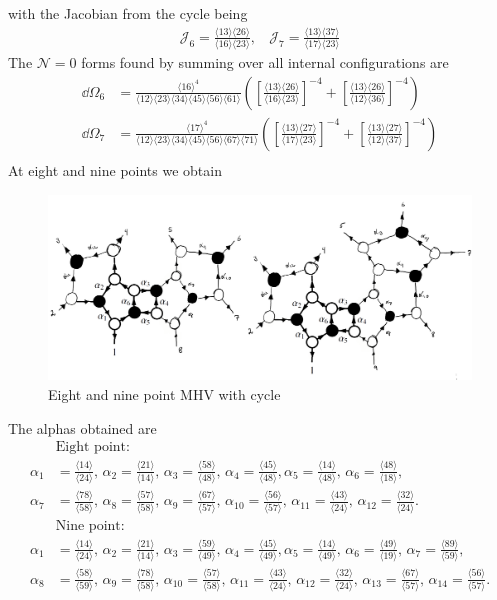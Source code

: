 \documentclass[letter,11pt]{article}
\newcommand{\J}{\mathcal{J}}
\newcommand{\ab}[1]{\langle #1 \rangle}
\begin{document}
with the Jacobian from the cycle being
\begin{equation}
	\begin{aligned}
		\J_6=\frac{\ab{13}\ab{26}}{\ab{16}\ab{23}},~~~~
		\J_7=\frac{\ab{13}\ab{37}}{\ab{17}\ab{23}}
	\end{aligned}
\end{equation}
The $\mathcal{N}=0$ forms found by summing over all internal configurations are
\begin{equation}
	\begin{aligned}
		\dd \Omega_6 &= \frac{\ab{16}^4}{\ab{12}\ab{23}\ab{34}\ab{45}\ab{56}\ab{61}}\left(\left[\frac{\ab{13}\ab{26}}{\ab{16}\ab{23}}
		\right]^{-4}+\left[\frac{\ab{13}\ab{26}}{\ab{12}\ab{36}}
		\right]^{-4}\right) \\
		\dd \Omega_7 &= \frac{\ab{17}^4}{\ab{12}\ab{23}\ab{34}\ab{45}\ab{56}\ab{67}\ab{71}}\left(\left[\frac{\ab{13}\ab{27}}{\ab{17}\ab{23}}
		\right]^{-4}+\left[\frac{\ab{13}\ab{27}}{\ab{12}\ab{37}}
		\right]^{-4}\right) \\
	\end{aligned}
\end{equation}
At eight and nine points we obtain
\begin{figure}[H]
	\centering
	\includegraphics[width=0.7\linewidth]{8+9pt}
	\caption{Eight and nine point MHV with cycle}
	\label{fig:two-loop}
\end{figure}
\noindent
The alphas obtained are
\begin{equation}
	\begin{aligned}
		&\text{Eight point}:\\
	\alpha_1&=\frac{\ab{14}}{\ab{24}},\,\alpha_2=\frac{\ab{21}}{\ab{14}},\,\alpha_3=\frac{\ab{58}}{\ab{48}},\,\alpha_4=\frac{\ab{45}}{\ab{48}},\alpha_5=\frac{\ab{14}}{\ab{48}},\,
	\alpha_6=\frac{\ab{48}}{\ab{18}},\\
	\alpha_7&=\frac{\ab{78}}{\ab{58}},\,\alpha_8=\frac{\ab{57}}{\ab{58}},\,\alpha_9=\frac{\ab{67}}{\ab{57}},\,\alpha_{10}=\frac{\ab{56}}{\ab{57}}
	,\,\alpha_{11}=\frac{\ab{43}}{\ab{24}}
	,\,\alpha_{12}=\frac{\ab{32}}{\ab{24}}
	.\\
		&\text{Nine point}:\\
		\alpha_1&=\frac{\ab{14}}{\ab{24}},\,\alpha_2=\frac{\ab{21}}{\ab{14}},\,\alpha_3=\frac{\ab{59}}{\ab{49}},\,\alpha_4=\frac{\ab{45}}{\ab{49}},\alpha_5=\frac{\ab{14}}{\ab{49}},\,
	\alpha_6=\frac{\ab{49}}{\ab{19}},\,
	\alpha_7=\frac{\ab{89}}{\ab{59}},\\
	\alpha_8&=\frac{\ab{58}}{\ab{59}},\,\alpha_9=\frac{\ab{78}}{\ab{58}},\,\alpha_{10}=\frac{\ab{57}}{\ab{58}}
	,\,\alpha_{11}=\frac{\ab{43}}{\ab{24}}
	,\,\alpha_{12}=\frac{\ab{32}}{\ab{24}}
	,\,\alpha_{13}=\frac{\ab{67}}{\ab{57}}
	,\,\alpha_{14}=\frac{\ab{56}}{\ab{57}}
	.
	\end{aligned}
\end{equation}
\end{document}
